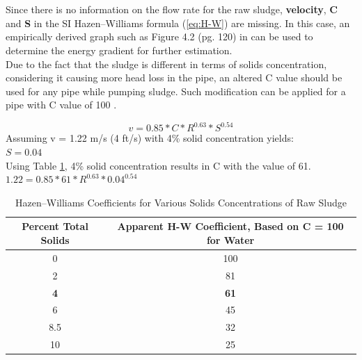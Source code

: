 \documentclass[a4paper]{article}
\begin{document}
\section{}
\begin{minipage}[c]{0.5\textwidth}
Since there is no information on the flow rate for the raw sludge, \textbf{velocity}, \textbf{C} and \textbf{S} in the SI Hazen–Williams formula (\ref{eq:H-W}) are missing. In this case, an empirically derived graph such as Figure 4.2 (pg. 120) in \autocite{sanin2011} can be used to determine the energy gradient for further estimation.\\Due to the fact that the sludge is different in terms of solids concentration, considering it causing more head loss in the pipe, an altered C value should be used for any pipe while pumping sludge. Such modification can be applied for a pipe with C value of 100 \autocite{brisbin1957}.
\end{minipage}
\hfill
\begin{minipage}{0.4\textwidth}
\end{minipage}
\begin{equation}
    v=0.85*C*R^{0.63}*S^{0.54} \label{eq:H-W}
\end{equation}
Assuming v = 1.22 m/s (4 ft/s) with 4\% solid concentration yields:\\
$S = 0.04$\\
Using Table \ref{tab:H-WCoeffs}, 4\% solid concentration results in C with the value of 61.
$1.22=0.85*61*R^{0.63}*0.04^{0.54}$
\begin{table}[ht]
    \centering
    \caption{Hazen–Williams Coefficients for Various Solids Concentrations of Raw Sludge \autocite{brisbin1957}}
    \begin{tabular}{cc}
    \toprule
    Percent Total Solids & Apparent H-W Coefficient, Based on C = 100 for Water \\
    \midrule
    0 & 100 \\
    2 & 81 \\
    \textbf{4} & \textbf{61} \\
    6 & 45 \\
    8.5 & 32 \\
    10 & 25 \\
    \bottomrule
    \end{tabular}
    \label{tab:H-WCoeffs}
\end{table}
\newpage
\printbibliography
\end{document}
